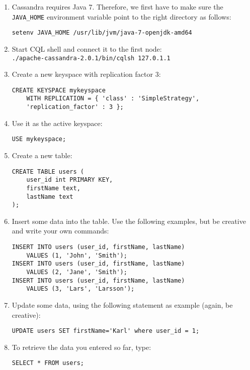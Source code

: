 \documentclass[a4paper,12pt]{article}
\newcommand\code[1]{\texttt{#1}}
\begin{document}
\begin{enumerate}
	\item Cassandra requires Java 7. Therefore, we first have to make sure the \code{JAVA\_HOME} environment variable point to the right directory as follows:
\begin{lstlisting}
setenv JAVA_HOME /usr/lib/jvm/java-7-openjdk-amd64
\end{lstlisting}

	\item Start CQL shell and connect it to the first node:\\
		\code{./apache-cassandra-2.0.1/bin/cqlsh 127.0.1.1}

	\item Create a new keyspace with replication factor 3:
\begin{lstlisting}
CREATE KEYSPACE mykeyspace
	WITH REPLICATION = { 'class' : 'SimpleStrategy',
	'replication_factor' : 3 };
\end{lstlisting}

	\item Use it as the active keyspace:
\begin{lstlisting}
USE mykeyspace;
\end{lstlisting}

	\item Create a new table:
\begin{lstlisting}
CREATE TABLE users (
	user_id int PRIMARY KEY,
	firstName text,
	lastName text
);
\end{lstlisting}

	\item Insert some data into the table. Use the following examples, but be creative and write your own commands:
\begin{lstlisting}
INSERT INTO users (user_id, firstName, lastName)
	VALUES (1, 'John', 'Smith');
INSERT INTO users (user_id, firstName, lastName)
	VALUES (2, 'Jane', 'Smith');
INSERT INTO users (user_id, firstName, lastName)
	VALUES (3, 'Lars', 'Larsson');
\end{lstlisting}

	\item Update some data, using the following statement as example (again, be creative):
\begin{lstlisting}
UPDATE users SET firstName='Karl' where user_id = 1;
\end{lstlisting}

	\item To retrieve the data you entered so far, type:
\begin{lstlisting}
SELECT * FROM users;
\end{lstlisting}


\end{enumerate}
\end{document}
